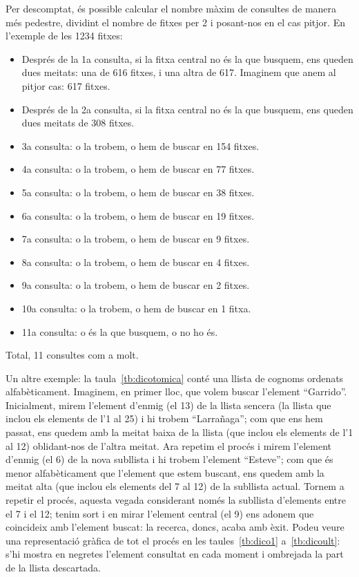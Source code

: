Per descomptat, és possible calcular el nombre màxim de consultes de
manera més pedestre, dividint el nombre de fitxes per 2 i posant-nos
en el cas pitjor. En l'exemple de les 1234 fitxes:
\begin{itemize}
\item Després de la 1a consulta, si la fitxa central no és la que busquem, ens queden dues meitats: una de 616 fitxes, i una altra de 617. Imaginem que anem al pitjor cas: 617 fitxes.
\item Després de la 2a consulta, si la fitxa central no és la que busquem, ens queden dues meitats de 308 fitxes.
\item 3a consulta: o la trobem, o hem de buscar en 154 fitxes.
\item 4a consulta: o la trobem, o hem de buscar en 77 fitxes.
\item 5a consulta: o la trobem, o hem de buscar en 38 fitxes.
\item 6a consulta: o la trobem, o hem de buscar en 19 fitxes.
\item 7a consulta: o la trobem, o hem de buscar en 9 fitxes.
\item 8a consulta: o la trobem, o hem de buscar en 4 fitxes.
\item 9a consulta: o la trobem, o hem de buscar en 2 fitxes.
\item 10a consulta: o la trobem, o hem de buscar en 1 fitxa.
\item 11a consulta: o és la que busquem, o no ho és.
\end{itemize}
Total, 11 consultes com a molt.

Un altre exemple: la taula~\ref{tb:dicotomica} conté una llista de cognoms ordenats
alfabèticament. Imaginem, en primer lloc, que volem buscar l'element
``Garrido''. Inicialment, mirem l'element d'enmig (el 13) de la llista
sencera (la llista que inclou els elements de l'1 al 25) i hi trobem
``Larrañaga''; com que ens hem passat, ens quedem amb la meitat baixa
de la llista (que inclou els elements de l'1 al 12) oblidant-nos de
l'altra meitat. Ara repetim el procés i mirem l'element d'enmig (el 6)
de la nova subllista i hi trobem l'element ``Esteve''; com que és
menor alfabèticament que l'element que estem buscant, ens quedem amb
la meitat alta (que inclou els elements del 7 al 12) de la subllista
actual. Tornem a repetir el procés, aquesta vegada considerant només
la subllista d'elements entre el 7 i el 12; tenim sort i en mirar
l'element central (el 9) ens adonem que coincideix amb l'element
buscat: la recerca, doncs, acaba amb èxit.  Podeu veure una
representació gràfica de tot el procés en les taules~\ref{tb:dico1}
a~\ref{tb:dicoult}: s'hi mostra en negretes l'element consultat en
cada moment i ombrejada la part de la llista descartada.

